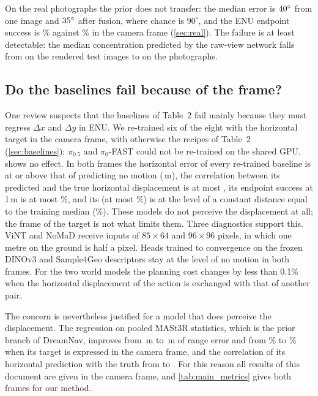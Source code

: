On the real photographs the prior does not transfer: the median error is $40^\circ$ from one image and $35^\circ$ after fusion, where chance is $90^\circ$, and the ENU endpoint success is \hdRealEnuSRe\% against \hdRealCamSRe\% in the camera frame (\cref{sec:real}). The failure is at least detectable: the median concentration predicted by the raw-view network falls from \hdRenderKappa{} on the rendered test images to \hdRealKappa{} on the photographs.



\subsection{Do the baselines fail because of the frame?}
\label{sec:camframe}

One review suspects that the baselines of Table~2 fail mainly because they must regress $\Delta x$ and $\Delta y$ in ENU. We re-trained six of the eight with the horizontal target in the camera frame, with otherwise the recipes of Table~2 (\cref{sec:baselines}); $\pi_{0.5}$ and $\pi_0$-FAST could not be re-trained on the shared GPU.  shows no effect. In both frames the horizontal error of every re-trained baseline is at or above that of predicting no motion (\cfZeroCamHor\,m), the correlation between its predicted and the true horizontal displacement is at most \cfMaxCamCorr, its endpoint success at 1\,m is at most \cfMaxCamSRe\%, and its \SRd{} (at most \cfMaxCamSRd\%) is at the level of a constant distance equal to the training median (\cfConstSRd\%). These models do not perceive the displacement at all; the frame of the target is not what limits them. Three diagnostics support this. ViNT and NoMaD receive inputs of $85{\times}64$ and $96{\times}96$ pixels, in which one metre on the ground is half a pixel. Heads trained to convergence on the frozen DINOv3 and Sample4Geo descriptors stay at the level of no motion in both frames. For the two world models the planning cost changes by less than 0.1\% when the horizontal displacement of the action is exchanged with that of another pair.

The concern is nevertheless justified for a model that does perceive the displacement. The regression on pooled MASt3R statistics, which is the prior branch of DreamNav, improves from \cfMlpEnuD\,m to \cfMlpCamD\,m of range error and from \cfMlpEnuSRd\% to \cfMlpCamSRd\% \SRd{} when its target is expressed in the camera frame, and the correlation of its horizontal prediction with the truth from \cfMlpEnuCorr{} to \cfMlpCamCorr. For this reason all results of this document are given in the camera frame, and \cref{tab:main_metrics} gives both frames for our method.
